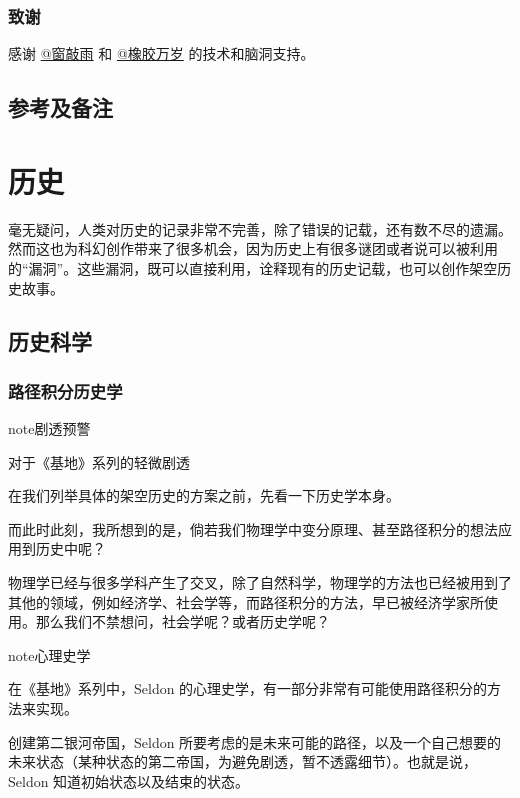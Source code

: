 \documentclass[letterpaper,10pt,english]{sphinxmanual}
\begin{document}
\subsubsection{致谢}
\label{superpower:id14}
感谢 \href{http://www.guokr.com/i/2038733165/}{@窗敲雨} 和 \href{http://www.guokr.com/i/1351044112/}{@橡胶万岁} 的技术和脑洞支持。


\subsection{参考及备注}
\label{superpower:id17}

\section{历史}
\label{history::doc}\label{history:id1}
毫无疑问，人类对历史的记录非常不完善，除了错误的记载，还有数不尽的遗漏。然而这也为科幻创作带来了很多机会，因为历史上有很多谜团或者说可以被利用的“漏洞”。这些漏洞，既可以直接利用，诠释现有的历史记载，也可以创作架空历史故事。


\subsection{历史科学}
\label{history:id2}

\subsubsection{路径积分历史学}
\label{history:id3}
\begin{notice}{note}{剧透预警}

对于《基地》系列的轻微剧透
\end{notice}

在我们列举具体的架空历史的方案之前，先看一下历史学本身。

而此时此刻，我所想到的是，倘若我们物理学中变分原理、甚至路径积分的想法应用到历史中呢？

物理学已经与很多学科产生了交叉，除了自然科学，物理学的方法也已经被用到了其他的领域，例如经济学、社会学等，而路径积分的方法，早已被经济学家所使用。那么我们不禁想问，社会学呢？或者历史学呢？

\begin{notice}{note}{心理史学}

在《基地》系列中，Seldon 的心理史学，有一部分非常有可能使用路径积分的方法来实现。

创建第二银河帝国，Seldon 所要考虑的是未来可能的路径，以及一个自己想要的未来状态（某种状态的第二帝国，为避免剧透，暂不透露细节）。也就是说，Seldon 知道初始状态以及结束的状态。
\end{notice}
\end{document}
